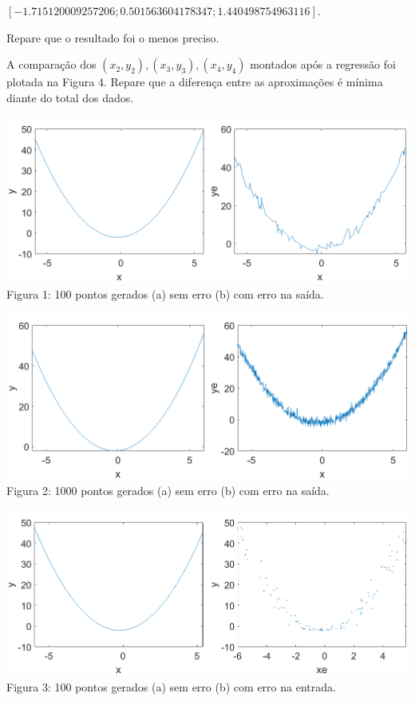 \documentclass{rbfin}
\begin{document}
$[-1.715120009257206;0.501563604178347;1.440498754963116]$.

Repare que o resultado foi o menos preciso.

A comparação dos $(x_2,y_2),(x_3,y_3),(x_4,y_4)$ montados após a regressão foi plotada na Figura 4. Repare que a diferença entre as aproximações é mínima diante do total dos dados.

\begin{center}
\includegraphics[scale=0.65]{1 gera 100}
Figura 1: 100 pontos gerados (a) sem erro (b) com erro na saída.
\end{center}

\begin{center}
\includegraphics[scale=0.65]{2 gera 1000}
Figura 2: 1000 pontos gerados (a) sem erro (b) com erro na saída.
\end{center}

\begin{center}
\includegraphics[scale=0.65]{3 gera mais 100}
Figura 3: 100 pontos gerados (a) sem erro (b) com erro na entrada.
\end{center}
\end{document}
